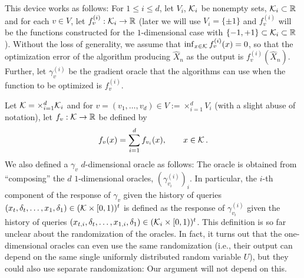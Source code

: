 This device works as follows: 
For $1\le i \le d$, let $V_i$, $\mathcal{K}_i$ be nonempty sets, $\mathcal{K}_i\subset \mathbb{R}$
and for each $v\in V$, let $f_v^{(i)}: \mathcal{K}_i \to \mathbb{R}$ 
(later we will use $V_i=\{\pm 1\}$ and $f_v^{(i)}$ will be the functions constructed for the $1$-dimensional case with $\{-1,+1\}\subset \mathcal{K}_i\subset \mathbb{R}$).
Without the loss of generality, we assume that $\inf_{x\in \mathcal{K}} f_v^{(i)}(x) = 0$, so that the optimization error of the algorithm producing $\hat{X}_n$  as the output is $f_v^{(i)}(\hat{X}_n)$.
Further, let $\gamma_v^{(i)}$ be the gradient oracle that the algorithms can use when 
the function to be optimized is $f_v^{(i)}$. 

Let $\mathcal{K} = \times_{i=1}^d \mathcal{K}_i$ and for $v = (v_1,\dots,v_d) \in V:= \times_{i=1}^d V_i$ (with a slight abuse of notation), let $f_v: \mathcal{K} \to \mathbb{R}$ be defined by
\begin{align*}
f_v(x) = \sum_{i=1}^d f_{v_i}(x), \qquad x\in \mathcal{K}\,.
\end{align*}
We also defined a
$\gamma_v$  $d$-dimensional oracle as follows: The oracle  is obtained from ``composing'' the $d$ $1$-dimensional oracles, $(\gamma_{v_i}^{(i)})_{i}$.
In particular, the $i$-th component of the response of $\gamma_v$ 
given the history of queries $(x_{t},\delta_{t},\dots,x_1,\delta_1)\in (\mathcal{K} \times [0,1))^t$
is defined as the response of $\gamma^{(i)}_{v_i}$ 
given the history of queries $(x_{t,i},\delta_{t},\dots,x_{1,i},\delta_1)\in (\mathcal{K}_i\times [0,1))^t$.
This definition is so far unclear about the randomization of the oracles. 
In fact, it turns out that the one-dimensional oracles can even use the same randomization (i.e.,
their output can depend on the same single uniformly distributed random variable $U$), but they could also use separate randomization: Our argument will not depend on this.

